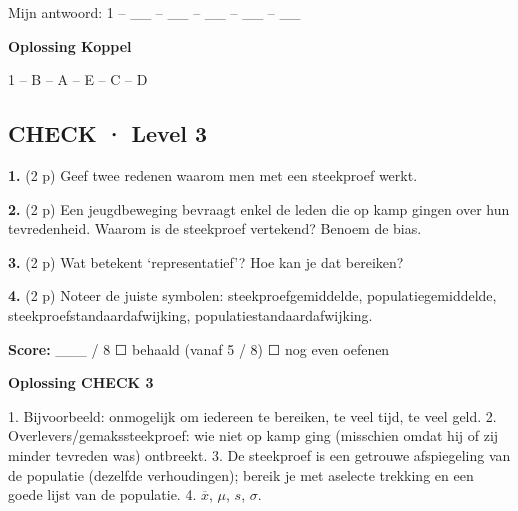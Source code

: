 Mijn antwoord: 1 – \_\_ – \_\_ – \_\_ – \_\_ – \_\_

\begin{oplossing}
\textbf{Oplossing Koppel}

1 – B  – A  – E  – C  – D
\end{oplossing}

\subsection*{CHECK · Level 3}

\textbf{1.} (2 p) Geef twee redenen waarom men met een steekproef werkt. \lijn

\textbf{2.} (2 p) Een jeugdbeweging bevraagt enkel de leden die op kamp gingen over hun tevredenheid. Waarom is de steekproef vertekend? Benoem de bias. \lijn

\textbf{3.} (2 p) Wat betekent ‘representatief’? Hoe kan je dat bereiken? \lijn

\textbf{4.} (2 p) Noteer de juiste symbolen: steekproefgemiddelde, populatiegemiddelde, steekproefstandaardafwijking, populatiestandaardafwijking. \lijn

\begin{doel}
\textbf{Score:} \_\_\_ / 8 \quad ☐ behaald (vanaf 5 / 8) \quad ☐ nog even oefenen
\end{doel}

\begin{oplossing}
\textbf{Oplossing CHECK 3}

1. Bijvoorbeeld: onmogelijk om iedereen te bereiken, te veel tijd, te veel geld. 2. Overlevers/gemakssteekproef: wie niet op kamp ging (misschien omdat hij of zij minder tevreden was) ontbreekt. 3. De steekproef is een getrouwe afspiegeling van de populatie (dezelfde verhoudingen); bereik je met aselecte trekking en een goede lijst van de populatie. 4. $\overline{x}$, $\mu$, $s$, $\sigma$.
\end{oplossing}
